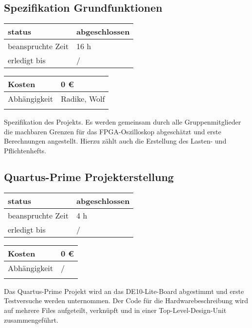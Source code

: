 \documentclass{scrartcl}
\begin{document}
\subsection{Spezifikation Grundfunktionen}
\begin{tabular}[h]{|l|l|} %
	\hline
	status & abgeschlossen\\
	\hline
	beanspruchte Zeit & 16 h\\
	\hline
	erledigt bis & / \\
	\hline
\end{tabular}
\begin{tabular}[h]{|l|l|} %
	\hline
	Kosten & 0 €\\
	\hline
	Abhängigkeit & Radike, Wolf\\
	\hline
	 &  \\
	\hline
\end{tabular}
Spezifikation des Projekts. Es werden gemeinsam durch alle Gruppenmitglieder die machbaren Grenzen für das FPGA-Oszilloskop abgeschätzt und erste Berechnungen angestellt. Hierzu zählt auch die Erstellung des Lasten- und Pflichtenhefts.
\subsection{Quartus-Prime Projekterstellung}
\begin{tabular}[h]{|l|l|} %
	\hline
	status & abgeschlossen\\
	\hline
	beanspruchte Zeit & 4 h\\
	\hline
	erledigt bis & / \\
	\hline
\end{tabular}
\begin{tabular}[h]{|l|l|} %
	\hline
	Kosten & 0 €\\
	\hline
	Abhängigkeit & /\\
	\hline
	 &  \\
	\hline
\end{tabular}
Das Quartus-Prime Projekt wird an das DE10-Lite-Board abgestimmt und erste Testversuche werden unternommen. Der Code für die Hardwarebeschreibung wird auf mehrere Files aufgeteilt, verknüpft und in einer Top-Level-Design-Unit zusammengeführt. 
\end{document}
